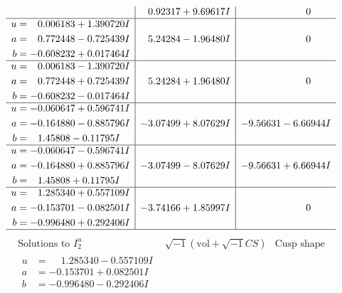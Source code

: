\documentclass[1p]{elsarticle_modified}
\theoremstyle{definition}
\newcommand{\I}{\sqrt{-1}}
\begin{document}
$$\begin{array}{c|c|c}
 & \phantom{-}0.92317 + 9.69617 I & \phantom{-0.000000 } 0 \\ \hline\begin{aligned}
u &= \phantom{-}0.006183 + 1.390720 I \\
a &= \phantom{-}0.772448 - 0.725439 I \\
b &= -0.608232 + 0.017464 I\end{aligned}
 & \phantom{-}5.24284 - 1.96480 I & \phantom{-0.000000 } 0 \\ \hline\begin{aligned}
u &= \phantom{-}0.006183 - 1.390720 I \\
a &= \phantom{-}0.772448 + 0.725439 I \\
b &= -0.608232 - 0.017464 I\end{aligned}
 & \phantom{-}5.24284 + 1.96480 I & \phantom{-0.000000 } 0 \\ \hline\begin{aligned}
u &= -0.060647 + 0.596741 I \\
a &= -0.164880 - 0.885796 I \\
b &= \phantom{-}1.45808 - 0.11795 I\end{aligned}
 & -3.07499 + 8.07629 I & -9.56631 - 6.66944 I \\ \hline\begin{aligned}
u &= -0.060647 - 0.596741 I \\
a &= -0.164880 + 0.885796 I \\
b &= \phantom{-}1.45808 + 0.11795 I\end{aligned}
 & -3.07499 - 8.07629 I & -9.56631 + 6.66944 I \\ \hline\begin{aligned}
u &= \phantom{-}1.285340 + 0.557109 I \\
a &= -0.153701 - 0.082501 I \\
b &= -0.996480 + 0.292406 I\end{aligned}
 & -3.74166 + 1.85997 I & \phantom{-0.000000 } 0\\
 \hline 
 \end{array}$$\newpage$$\begin{array}{c|c|c}  
\text{Solutions to }I^u_{2}& \I (\text{vol} + \sqrt{-1}CS) & \text{Cusp shape}\\
 \hline 
\begin{aligned}
u &= \phantom{-}1.285340 - 0.557109 I \\
a &= -0.153701 + 0.082501 I \\
b &= -0.996480 - 0.292406 I\end{aligned}

\end{array}$$
\end{document}

